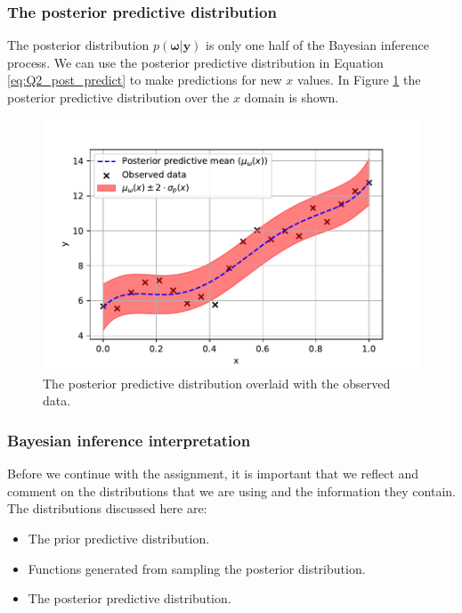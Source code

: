 \documentclass{article}
\begin{document}
\subsubsection{The posterior predictive distribution}
The posterior distribution $p(\boldsymbol\omega \vert \mathbf{y})$ is only one half of the Bayesian inference process. We can use the posterior predictive distribution in Equation \eqref{eq:Q2_post_predict} to make predictions for new $x$ values. In Figure \ref{fig:Q2_post_predict} the posterior predictive distribution over the $x$ domain is shown.
\begin{figure}[htb!]
\centering
\includegraphics[scale=0.5]{Q2_4.pdf}
\caption{The posterior predictive distribution overlaid with the observed data.}
\label{fig:Q2_post_predict}
\end{figure}

\subsubsection{Bayesian inference interpretation}
Before we continue with the assignment, it is important that we reflect and comment on the distributions that we are using and the information they contain. The distributions discussed here are:
\begin{itemize}
\item The prior predictive distribution.
\item Functions generated from sampling the posterior distribution.
\item The posterior predictive distribution.
\end{itemize}
\end{document}
